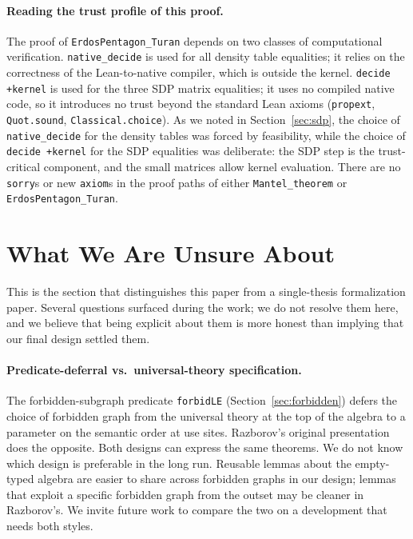 \documentclass{article}
\newcommand{\lean}[1]{\texttt{#1}}
\begin{document}
\paragraph{Reading the trust profile of this proof.}
The proof of \lean{ErdosPentagon\_Turan} depends on two classes of
computational verification.  \lean{native\_decide} is used for all density
table equalities; it relies on the correctness of the Lean-to-native
compiler, which is outside the kernel.  \lean{decide +kernel} is used for the
three SDP matrix equalities; it uses no compiled native code, so it
introduces no trust beyond the standard Lean axioms (\lean{propext},
\lean{Quot.sound}, \lean{Classical.choice}).  As we noted in
Section~\ref{sec:sdp}, the choice of \lean{native\_decide} for the density
tables was forced by feasibility, while the choice of \lean{decide +kernel}
for the SDP equalities was deliberate: the SDP step is the trust-critical
component, and the small matrices allow kernel evaluation.  There are no
\lean{sorry}s or new \lean{axiom}s in the proof paths of either
\lean{Mantel\_theorem} or \lean{ErdosPentagon\_Turan}.


\section{What We Are Unsure About}
\label{sec:unsure}

This is the section that distinguishes this paper from a single-thesis
formalization paper.  Several questions surfaced during the work; we do not
resolve them here, and we believe that being explicit about them is more
honest than implying that our final design settled them.

\paragraph{Predicate-deferral vs.\ universal-theory specification.}
The forbidden-subgraph predicate \lean{forbidLE}
(Section~\ref{sec:forbidden}) defers the choice of forbidden graph from the
universal theory at the top of the algebra to a parameter on the semantic
order at use sites.  Razborov's original presentation does the opposite.
Both designs can express the same theorems.  We do not know which design is
preferable in the long run.  Reusable lemmas about the empty-typed algebra
are easier to share across forbidden graphs in our design; lemmas that
exploit a specific forbidden graph from the outset may be cleaner in
Razborov's.  We invite future work to compare the two on a development that
needs both styles.
\end{document}
